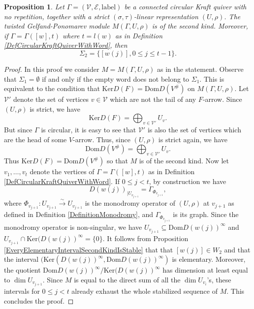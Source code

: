 \documentclass[12pt]{amsart}
\newtheorem{proposition}[theorem]{Proposition}
\theoremstyle{definition}
\newcommand{\<}{\langle}   %
\renewcommand{\>}{\rangle} %
\begin{document}
\begin{proposition}\label{AllCircularKraftAreSecondKind}
    Let $\Gamma= (\mathcal V, \mathcal E, \mathrm{label})$ be a connected circular Kraft quiver with no repetition, together with a strict $(\sigma,\tau)$-linear representation $(U,\rho)$. The twisted Gelfand-Ponomarev module $M(\Gamma,U,\rho)$ is of the second kind. Moreover, if $\Gamma = \Gamma([w],t)$ where $t = l(w)$ as in Definition \ref{DefCircularKraftQuiverWithWord}, then 
    \begin{equation*}
        \Sigma_2 = \{[w(j)], 0 \leq j \leq t-1\}.
    \end{equation*}
\end{proposition}

\begin{proof}
    In this proof we consider $M = M(\Gamma,U,\rho)$ as in the statement. Observe that $\Sigma_1 = \emptyset$ if and only if the empty word does not belong to $\Sigma_1$. This is equivalent to the condition that $\mathrm{Ker}D(F) = \mathrm{Dom}D(V^{\#})$ on $M(\Gamma,U,\rho)$. Let $\mathcal V'$ denote the set of vertices $v\in \mathcal V$ which are not the tail of any $F$-arrow. Since $(U,\rho)$ is strict, we have
    \begin{equation*}
        \mathrm{Ker}D(F) = \bigoplus_{v \in \mathcal V'} U_v.
    \end{equation*}
    But since $\Gamma$ is circular, it is easy to see that $\mathcal V'$ is also the set of vertices which are the head of some $V$-arrow. Thus, since $(U,\rho)$ is strict again, we have 
    \begin{equation*}
        \mathrm{Dom}D(V^{\#}) = \bigoplus_{v \in \mathcal V'} U_v.
    \end{equation*}
    Thus $\mathrm{Ker}D(F) = \mathrm{Dom}D(V^{\#})$ so that $M$ is of the second kind. Now let $v_1,\ldots ,v_t$ denote the vertices of $\Gamma = \Gamma([w],t)$ as in Definition \ref{DefCircularKraftQuiverWithWord}. If $0 \leq j < t$, by construction we have 
    \begin{equation*}
        D(w(j))_{|U_{v_{j+1}}} = \Gamma_{\Phi_{v_{j+1}}},
    \end{equation*}
    where $\Phi_{v_{j+1}} : U_{v_{j+1}} \xrightarrow{\sim} U_{v_{j+1}}$ is the monodromy operator of $(U,\rho)$ at $v_{j+1}$ as defined in Definition \ref{DefinitionMonodromy}, and $\Gamma_{\Phi_{v_{j+1}}}$ is its graph. Since the monodromy operator is non-singular, we have $U_{v_{j+1}} \subseteq  \mathrm{Dom}D(w(j))^{\infty}$ and $U_{v_{j+1}} \cap \mathrm{Ker}(D(w(j))^{\infty} = \{0\}$. It follows from Proposition \ref{EveryElementaryIntervalSecondKindIsStable} that that $[w(j)] \in W_2$ and that the interval $(\mathrm{Ker}(D(w(j))^{\infty}, \mathrm{Dom}D(w(j))^{\infty})$ is elementary. Moreover, the quotient $        \mathrm{Dom}D(w(j))^{\infty} / \mathrm{Ker}(D(w(j))^{\infty}$ has dimension at least equal to $\dim U_{v_{j+1}}$. Since $M$ is equal to the direct sum of all the $\dim U_{v_i}$'s, these intervals for $0 \leq j < t$ already exhaust the whole stabilized sequence of $M$. This concludes the proof.    
\end{proof} 
\end{document}

